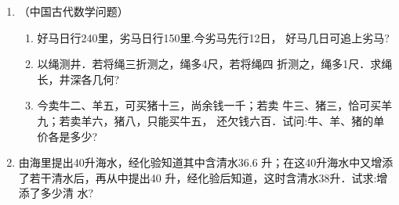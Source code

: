 \begin{enumerate}
\item （中国古代数学问题）
\begin{enumerate}
    \item 好马日行240里，劣马日行150里.今劣马先行12日，
    好马几日可追上劣马?
    \item 以绳测井．若将绳三折测之，绳多4尺，若将绳四
    折测之，绳多1尺．求绳长，井深各几何?
    \item 今卖牛二、羊五，可买猪十三，尚余钱一千；若卖
      牛三、猪三，恰可买羊九；若卖羊六，猪八，只能买牛五，
      还欠钱六百．试问:牛、羊、猪的单价各是多少?
\end{enumerate}


  \item 由海里提出40升海水，经化验知道其中含清水36.6
升；在这40升海水中又增添了若干清水后，再从中提出40
升，经化验后知道，这时含清水38升．试求:增添了多少清
  水?

\end{enumerate}

